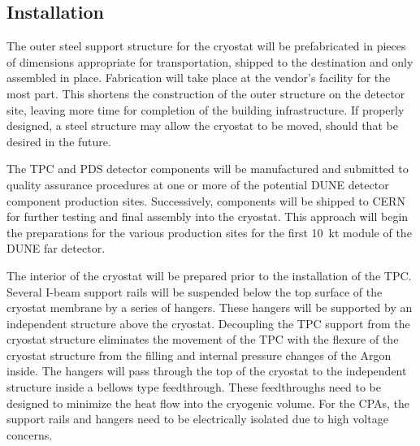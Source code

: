 



%

\subsection{Installation}

The outer steel support structure for the cryostat will be prefabricated in pieces of dimensions appropriate for transportation, shipped to the destination and only assembled in place.  Fabrication will take place at the vendor's facility for the most part. This shortens the construction of the outer structure on the detector site, leaving more time for completion of the building infrastructure. If properly designed, a steel structure may allow the cryostat to be moved, should that be desired in the future.

The TPC and PDS detector components will be manufactured and submitted to quality assurance procedures at one or more of the potential DUNE detector component production sites. Successively, components will be shipped to CERN for further testing and final assembly into the cryostat. This approach will begin the preparations for the various production sites for the first 10~kt module of the DUNE far detector.

The interior of the cryostat will be prepared prior to the installation of the TPC.  Several I-beam support rails will be suspended below the top surface of the cryostat membrane by a series of hangers.  These hangers will be supported by an independent structure above the cryostat.  Decoupling the TPC support from the cryostat structure eliminates the movement of the TPC with the flexure of the cryostat structure from the filling and internal pressure changes of the Argon inside.  The hangers will pass through the top of the cryostat to the independent structure inside a bellows type feedthrough.  These feedthroughs need to be designed to minimize the heat flow into the cryogenic volume.  For the CPAs, the support rails and hangers need to be electrically isolated due to high voltage concerns.  %

